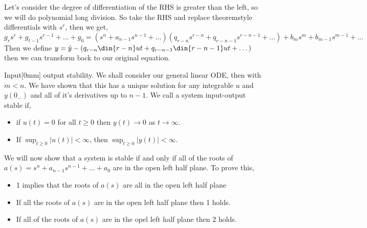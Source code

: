 Let's consider the degree of differentiation of the RHS is greater than the left, so we will do polynomial long division. So take the RHS and replace theoremstyle differentials with $s^r$, then we get,
$$ g_rs^r + g_{t-1}s^{r-1} + \dots + g_0 = (s^n + a_{n-1}s^{n-1} + \dots) (q_{r-n}s^{r-n} + q_{r-n-1}s^{r-n-1} + \dots) + b_ms^m + b_{m-1}s^{m-1} + \dots $$
Then we define $y = \hat y - (q_{r-n}\din {r-n} u t + q_{r-n-1}\din {r-n-1} u t + \dots)$ then we can transform back to our original equation.

Input[0mm] output stability. We shall consider our general linear ODE, then with $m < n$. We have shown that this has a unique solution for any integrable $u$ and $y(0_-)$ and all of it's derivatives up to $n - 1$. We call a system input-output stable if,
\begin{itemize}
  \item if $u(t) = 0$ for all $t \ge 0$ then $y(t) \to 0$ as $t \to \infty$.
  \item If $\sup_{t\ge 0} {|u(t)|} < \infty$, then $\sup_{t \ge 0} {|y(t)|} < \infty$.
\end{itemize}

We will now show that a system is stable if and only if all of the roots of $a(s) = s^n + a_{n-1}s^{n-1} + \dots + a_0$ are in the open left half plane. To prove this,
\begin{itemize}
  \item 1 implies that the roots of $a(s)$ are all in the open left half plane
  \item If all the roots of $a(s)$ are in the open left half plane then 1 holds.
  \item If all of the roots of $a(s)$ are in the opel left half plane then 2 holds.
\end{itemize}

